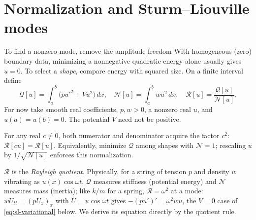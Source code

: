 \documentclass[11pt]{beamer}
\newcommand{\dd}{\,d}
\newcommand{\Q}{\mathcal Q}
\newcommand{\N}{\mathcal N}
\newcommand{\R}{\mathcal R}
\begin{document}
\section{Normalization and Sturm--Liouville modes}

\begin{frame}{To find a nonzero mode, remove the amplitude freedom}
\small
With homogeneous (zero) boundary data, minimizing a nonnegative quadratic energy alone
usually gives $u=0$. To select a \emph{shape}, compare energy with squared size.
On a finite interval define
\begin{equation}
 \Q[u]=\int_a^b\bigl(pu'^2+Vu^2\bigr)\dd x,\quad
 \N[u]=\int_a^bwu^2\dd x,\quad
 \R[u]=\frac{\Q[u]}{\N[u]}.\label{eq:rayleigh}
\end{equation}
For now take smooth real coefficients, $p,w>0$, a nonzero real $u$, and
$u(a)=u(b)=0$. The potential $V$ need not be positive.

\medskip
For any real $c\ne0$, both numerator and denominator acquire the factor $c^2$:
$\R[cu]=\R[u]$. Equivalently, minimize $\Q$ among shapes with $\N=1$;
rescaling $u$ by $1/\sqrt{\N[u]}$ enforces this normalization.

\medskip
$\R$ is the \emph{Rayleigh quotient}. Physically, for a string of tension $p$ and
density $w$ vibrating as $u(x)\cos\omega t$, $\Q$ measures stiffness (potential energy)
and $\N$ measures mass (inertia); like $k/m$ for a spring, $\R=\omega^2$ at a mode:
$wU_{tt}=(pU_x)_x$ with $U=u\cos\omega t$ gives $-(pu')'=\omega^2wu$, the $V=0$ case of
\eqref{eq:sl-variational} below.
We derive its equation directly by the quotient rule.
\end{frame}
\end{document}
